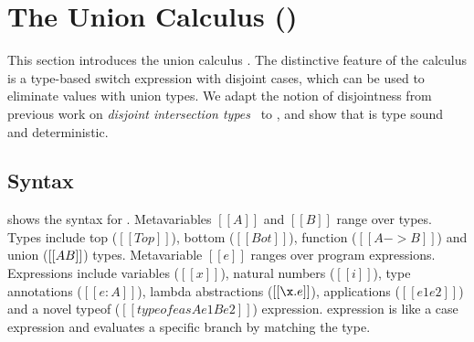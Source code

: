 \section{The Union Calculus (\name)}
\label{sec:union}

This section introduces the union calculus \name. The distinctive feature
of the \name calculus is a type-based switch expression with disjoint
cases, which can be used to eliminate values with union types.
We adapt the notion of disjointness from previous work on
\emph{disjoint intersection types}~\cite{} to \name, and show that \name is type
sound and deterministic.


\subsection{Syntax}\label{sec:union:syntax}
 shows the syntax for \cal. Metavariables
$[[A]]$ and $[[B]]$ range over types.  Types include top ($[[Top]]$),
bottom ($[[Bot]]$), function ($[[A -> B]]$) and union ($[[A \/ B]]$)
types. Metavariable $[[e]]$ ranges over program
expressions. Expressions include variables ($[[x]]$), natural numbers
($[[i]]$), type annotations ($[[e:A]]$), lambda abstractions
($[[\x.e]]$), applications ($[[e1 e2]]$) and a novel typeof ($[[typeof
    e as A e1 B e2]]$) expression. \Typeof expression is like a case
expression and evaluates a specific branch by matching the
type.

